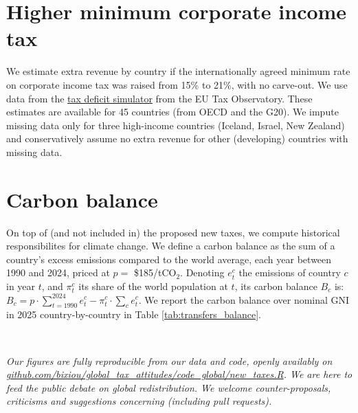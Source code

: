 \documentclass[12pt,english]{article}
\begin{document}
\section{Higher minimum corporate income tax}

We estimate extra revenue by country if the internationally agreed minimum rate on corporate income tax was raised from 15\% to 21\%, with no carve-out. We use data from the \href{https://www.taxobservatory.eu/fr/base-de-donn%C3%A9es/the-tax-deficit-simulator/}{tax deficit simulator} from the EU Tax Observatory. These estimates are available for 45 countries (from OECD and the G20). We impute missing data only for three high-income countries (Iceland, Israel, New Zealand) and conservatively assume no extra revenue for other (developing) countries with missing data.

\section{Carbon balance}

On top of (and not included in) the proposed new taxes, we compute historical responsibilites for climate change. We define a carbon balance as the sum of a country's excess emissions compared to the world average, each year between 1990 and 2024, priced at $p=$ \$185/tCO$_\text{2}$. Denoting $e_t^c$ the emissions of country $c$ in year $t$, and $\pi_t^c$ its share of the world population at $t$, its carbon balance $B_c$ is: $ B_c = p \cdot \sum_{t=1990}^{2024} e_t^c - \pi_t^c \cdot \sum_c e_t^c \text{.}$
We report the carbon balance over nominal GNI in 2025 country-by-country in Table \ref{tab:transfers_balance}.

\quad \\ \quad 

\clearpage

\textit{Our figures are fully reproducible from our data and code, openly availably on\\ \href{https://github.com/bixiou/global_tax_attitudes/code_global/new_taxes.R}{github.com/bixiou/global\_tax\_attitudes/code\_global/new\_taxes.R}. We are here to feed the public debate on global redistribution. We welcome counter-proposals, criticisms and suggestions concerning (including pull requests).  }
\end{document}
